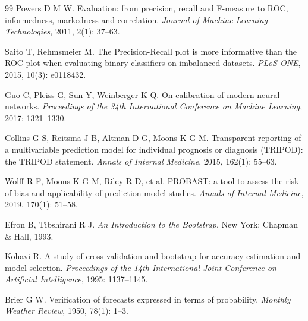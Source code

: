 \documentclass[UTF8,a4paper,11pt,fontset=none]{ctexart}
\begin{document}
\begin{thebibliography}{99}
Powers D M W. Evaluation: from precision, recall and F-measure to ROC, informedness, markedness and correlation. \textit{Journal of Machine Learning Technologies}, 2011, 2(1): 37--63.

Saito T, Rehmsmeier M. The Precision-Recall plot is more informative than the ROC plot when evaluating binary classifiers on imbalanced datasets. \textit{PLoS ONE}, 2015, 10(3): e0118432.

Guo C, Pleiss G, Sun Y, Weinberger K Q. On calibration of modern neural networks. \textit{Proceedings of the 34th International Conference on Machine Learning}, 2017: 1321--1330.

Collins G S, Reitsma J B, Altman D G, Moons K G M. Transparent reporting of a multivariable prediction model for individual prognosis or diagnosis (TRIPOD): the TRIPOD statement. \textit{Annals of Internal Medicine}, 2015, 162(1): 55--63.

Wolff R F, Moons K G M, Riley R D, et al. PROBAST: a tool to assess the risk of bias and applicability of prediction model studies. \textit{Annals of Internal Medicine}, 2019, 170(1): 51--58.

Efron B, Tibshirani R J. \textit{An Introduction to the Bootstrap}. New York: Chapman \& Hall, 1993.

Kohavi R. A study of cross-validation and bootstrap for accuracy estimation and model selection. \textit{Proceedings of the 14th International Joint Conference on Artificial Intelligence}, 1995: 1137--1145.

Brier G W. Verification of forecasts expressed in terms of probability. \textit{Monthly Weather Review}, 1950, 78(1): 1--3.
\end{thebibliography}
\end{document}
